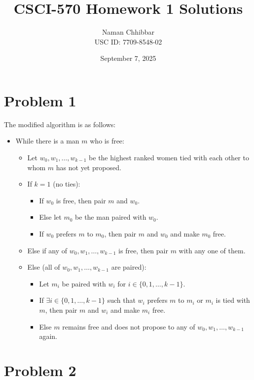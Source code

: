 \documentclass{article}
\title{CSCI-570 Homework 1 Solutions}
\author{
  Naman Chhibbar \\
  USC ID: 7709-8548-02
}
\date{September 7, 2025}
\begin{document}
\maketitle

\section{Problem 1}

  The modified algorithm is as follows:

  \begin{itemize}
    \item While there is a man $m$ who is free:
    \begin{itemize}
      \item Let $w_0, w_1, \dots, w_{k-1}$ be the highest ranked women tied with each other to whom $m$ has not yet proposed.
      \item If $k = 1$ (no ties):
      \begin{itemize}
        \item If $w_0$ is free, then pair $m$ and $w_0$.
        \item Else let $m_0$ be the man paired with $w_0$.
        \item If $w_0$ prefers $m$ to $m_0$, then pair $m$ and $w_0$ and make $m_0$ free.
      \end{itemize}
      \item Else if any of $w_0, w_1, \dots, w_{k-1}$ is free, then pair $m$ with any one of them.
      \item Else (all of $w_0, w_1, \dots, w_{k-1}$ are paired):
      \begin{itemize}
        \item Let $m_i$ be paired with $w_i$ for $i \in \{0, 1, \dots, k-1\}$.
        \item If $\exists i \in \{0, 1, \dots, k-1\}$ such that $w_i$ prefers $m$ to $m_i$ or $m_i$ is tied with $m$, then pair $m$ and $w_i$ and make $m_i$ free.
        \item Else $m$ remains free and does not propose to any of $w_0, w_1, \dots, w_{k-1}$ again.
      \end{itemize}
    \end{itemize}
  \end{itemize}

\section{Problem 2}
\end{document}

